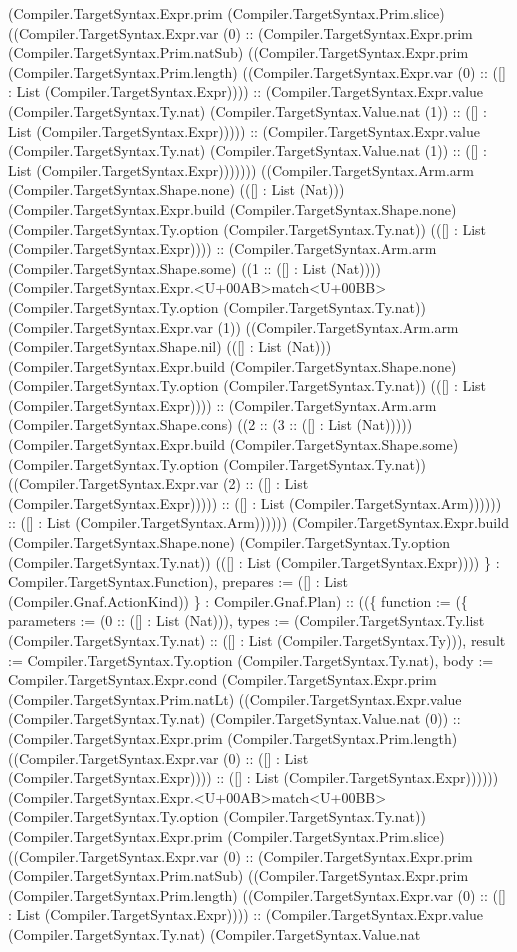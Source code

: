 \documentclass[11pt]{article}
\begin{document}
(Compiler.TargetSyntax.Expr.prim (Compiler.TargetSyntax.Prim.slice) ((Compiler.TargetSyntax.Expr.var (0) :: (Compiler.TargetSyntax.Expr.prim (Compiler.TargetSyntax.Prim.natSub) ((Compiler.TargetSyntax.Expr.prim (Compiler.TargetSyntax.Prim.length) ((Compiler.TargetSyntax.Expr.var (0) :: ([] : List (Compiler.TargetSyntax.Expr)))) :: (Compiler.TargetSyntax.Expr.value (Compiler.TargetSyntax.Ty.nat) (Compiler.TargetSyntax.Value.nat (1)) :: ([] : List (Compiler.TargetSyntax.Expr))))) :: (Compiler.TargetSyntax.Expr.value (Compiler.TargetSyntax.Ty.nat) (Compiler.TargetSyntax.Value.nat (1)) :: ([] : List (Compiler.TargetSyntax.Expr))))))) ((Compiler.TargetSyntax.Arm.arm (Compiler.TargetSyntax.Shape.none) (([] : List (Nat))) (Compiler.TargetSyntax.Expr.build (Compiler.TargetSyntax.Shape.none) (Compiler.TargetSyntax.Ty.option (Compiler.TargetSyntax.Ty.nat)) (([] : List (Compiler.TargetSyntax.Expr)))) :: (Compiler.TargetSyntax.Arm.arm (Compiler.TargetSyntax.Shape.some) ((1 :: ([] : List (Nat)))) (Compiler.TargetSyntax.Expr.<U+00AB>match<U+00BB> (Compiler.TargetSyntax.Ty.option (Compiler.TargetSyntax.Ty.nat)) (Compiler.TargetSyntax.Expr.var (1)) ((Compiler.TargetSyntax.Arm.arm (Compiler.TargetSyntax.Shape.nil) (([] : List (Nat))) (Compiler.TargetSyntax.Expr.build (Compiler.TargetSyntax.Shape.none) (Compiler.TargetSyntax.Ty.option (Compiler.TargetSyntax.Ty.nat)) (([] : List (Compiler.TargetSyntax.Expr)))) :: (Compiler.TargetSyntax.Arm.arm (Compiler.TargetSyntax.Shape.cons) ((2 :: (3 :: ([] : List (Nat))))) (Compiler.TargetSyntax.Expr.build (Compiler.TargetSyntax.Shape.some) (Compiler.TargetSyntax.Ty.option (Compiler.TargetSyntax.Ty.nat)) ((Compiler.TargetSyntax.Expr.var (2) :: ([] : List (Compiler.TargetSyntax.Expr))))) :: ([] : List (Compiler.TargetSyntax.Arm)))))) :: ([] : List (Compiler.TargetSyntax.Arm)))))) (Compiler.TargetSyntax.Expr.build (Compiler.TargetSyntax.Shape.none) (Compiler.TargetSyntax.Ty.option (Compiler.TargetSyntax.Ty.nat)) (([] : List (Compiler.TargetSyntax.Expr)))) \} : Compiler.TargetSyntax.Function), prepares := ([] : List (Compiler.Gnaf.ActionKind)) \} : Compiler.Gnaf.Plan) :: ((\{ function := (\{ parameters := (0 :: ([] : List (Nat))), types := (Compiler.TargetSyntax.Ty.list (Compiler.TargetSyntax.Ty.nat) :: ([] : List (Compiler.TargetSyntax.Ty))), result := Compiler.TargetSyntax.Ty.option (Compiler.TargetSyntax.Ty.nat), body := Compiler.TargetSyntax.Expr.cond (Compiler.TargetSyntax.Expr.prim (Compiler.TargetSyntax.Prim.natLt) ((Compiler.TargetSyntax.Expr.value (Compiler.TargetSyntax.Ty.nat) (Compiler.TargetSyntax.Value.nat (0)) :: (Compiler.TargetSyntax.Expr.prim (Compiler.TargetSyntax.Prim.length) ((Compiler.TargetSyntax.Expr.var (0) :: ([] : List (Compiler.TargetSyntax.Expr)))) :: ([] : List (Compiler.TargetSyntax.Expr)))))) (Compiler.TargetSyntax.Expr.<U+00AB>match<U+00BB> (Compiler.TargetSyntax.Ty.option (Compiler.TargetSyntax.Ty.nat)) (Compiler.TargetSyntax.Expr.prim (Compiler.TargetSyntax.Prim.slice) ((Compiler.TargetSyntax.Expr.var (0) :: (Compiler.TargetSyntax.Expr.prim (Compiler.TargetSyntax.Prim.natSub) ((Compiler.TargetSyntax.Expr.prim (Compiler.TargetSyntax.Prim.length) ((Compiler.TargetSyntax.Expr.var (0) :: ([] : List (Compiler.TargetSyntax.Expr)))) :: (Compiler.TargetSyntax.Expr.value (Compiler.TargetSyntax.Ty.nat) (Compiler.TargetSyntax.Value.nat 
\end{document}
